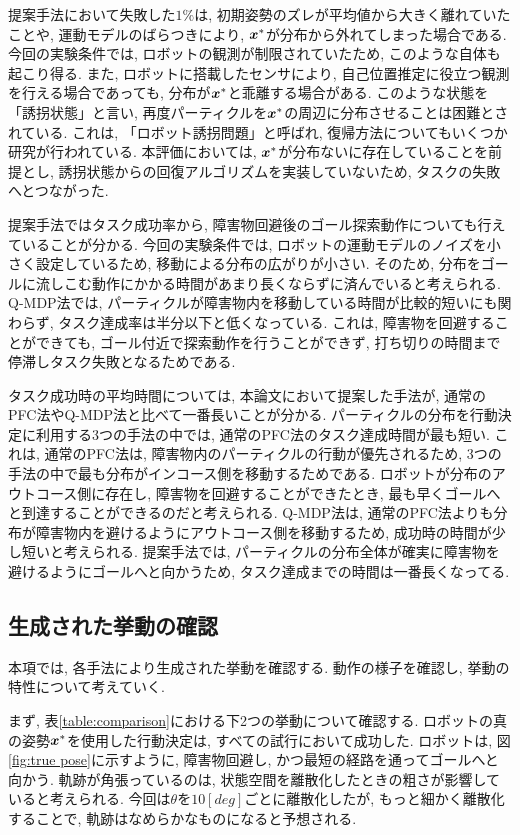 提案手法において失敗した$1\%$は, 初期姿勢のズレが平均値から大きく離れていたことや, 運動モデルのばらつきにより, 
$\boldsymbol{x}^{*}$が分布から外れてしまった場合である. 
今回の実験条件では, ロボットの観測が制限されていたため, このような自体も起こり得る. 
また, ロボットに搭載したセンサにより, 自己位置推定に役立つ観測を行える場合であっても, 分布が$\boldsymbol{x}^{*}$と乖離する場合がある. 
このような状態を「誘拐状態」と言い, 再度パーティクルを$\boldsymbol{x}^{*}$の周辺に分布させることは困難とされている. 
これは, 「ロボット誘拐問題」と呼ばれ, 復帰方法についてもいくつか研究が行われている\cite{lenser2000etal, aa}. 
本評価においては, $\boldsymbol{x}^{*}$が分布ないに存在していることを前提とし, 誘拐状態からの回復アルゴリズムを実装していないため, 
タスクの失敗へとつながった. 

提案手法ではタスク成功率から, 障害物回避後のゴール探索動作についても行えていることが分かる. 
今回の実験条件では, ロボットの運動モデルのノイズを小さく設定しているため, 移動による分布の広がりが小さい. 
そのため, 分布をゴールに流しこむ動作にかかる時間があまり長くならずに済んでいると考えられる. 
Q-MDP法では, パーティクルが障害物内を移動している時間が比較的短いにも関わらず, タスク達成率は半分以下と低くなっている. 
これは, 障害物を回避することができても, ゴール付近で探索動作を行うことができず, 打ち切りの時間まで停滞しタスク失敗となるためである. 

タスク成功時の平均時間については, 本論文において提案した手法が, 通常のPFC法やQ-MDP法と比べて一番長いことが分かる. 
パーティクルの分布を行動決定に利用する3つの手法の中では, 通常のPFC法のタスク達成時間が最も短い. 
これは, 通常のPFC法は, 障害物内のパーティクルの行動が優先されるため, 3つの手法の中で最も分布がインコース側を移動するためである. 
ロボットが分布のアウトコース側に存在し, 障害物を回避することができたとき, 最も早くゴールへと到達することができるのだと考えられる. 
Q-MDP法は, 通常のPFC法よりも分布が障害物内を避けるようにアウトコース側を移動するため, 成功時の時間が少し短いと考えられる. 
提案手法では, パーティクルの分布全体が確実に障害物を避けるようにゴールへと向かうため, タスク達成までの時間は一番長くなってる. 


\subsection{生成された挙動の確認}
本項では, 各手法により生成された挙動を確認する. 
動作の様子を確認し, 挙動の特性について考えていく. 

まず, 表\ref{table:comparison}における下2つの挙動について確認する. 
ロボットの真の姿勢$\boldsymbol{x}^{*}$を使用した行動決定は, すべての試行において成功した. 
ロボットは, 図\ref{fig:true pose}に示すように, 障害物回避し, かつ最短の経路を通ってゴールへと向かう. 
軌跡が角張っているのは, 状態空間を離散化したときの粗さが影響していると考えられる. 
今回は$\theta$を$10[\si{deg}]$ごとに離散化したが, もっと細かく離散化することで, 軌跡はなめらかなものになると予想される. 

